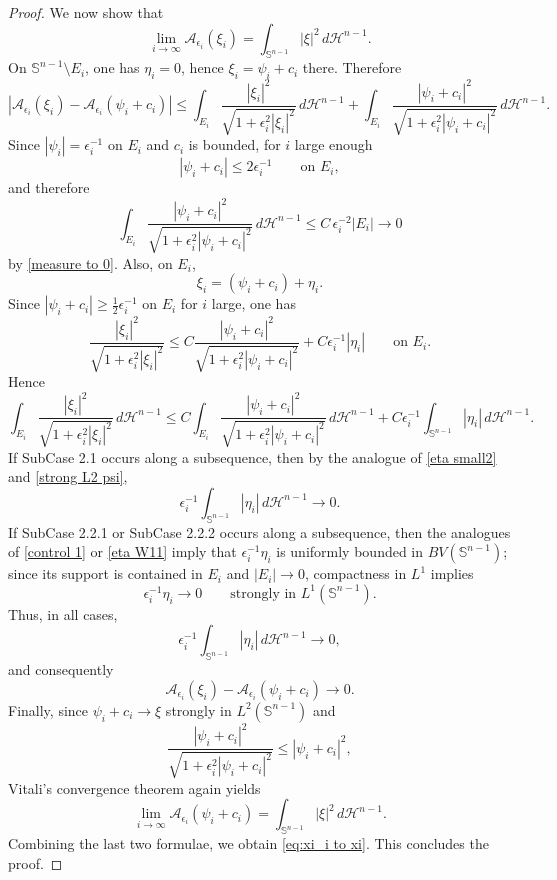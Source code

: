 \documentclass[10pt,a4paper]{amsart}
\begin{document}
\begin{proof}
We now show that
$$
\lim_{i\to\infty} \mathcal  A_{\epsilon_i}(\xi_i)=\int_{\mathbb S^{n-1}} |\xi|^2\,d\mathscr H^{n-1}.
$$
On $\mathbb S^{n-1}\setminus E_i$, one has $\eta_i=0$, hence $\xi_i=\psi_i+c_i$ there. Therefore
$$
|\mathcal A_{\epsilon_i}(\xi_i)-\mathcal A_{\epsilon_i}(\psi_i+c_i)|
\le
\int_{E_i}\frac{|\xi_i|^2}{\sqrt{1+\epsilon_i^2|\xi_i|^2}}\,d\mathscr H^{n-1}
+
\int_{E_i}\frac{|\psi_i+c_i|^2}{\sqrt{1+\epsilon_i^2|\psi_i+c_i|^2}}\,d\mathscr H^{n-1}.
$$
Since $|\psi_i|=\epsilon_i^{-1}$ on $E_i$ and $c_i$ is bounded, for $i$ large enough
$$
|\psi_i+c_i|\le 2\epsilon_i^{-1}\qquad\text{on }E_i,
$$
and therefore
$$
\int_{E_i}\frac{|\psi_i+c_i|^2}{\sqrt{1+\epsilon_i^2|\psi_i+c_i|^2}}\,d\mathscr H^{n-1}
\le C\,\epsilon_i^{-2}|E_i|\to 0
$$
by \eqref{measure to 0}. Also, on $E_i$,
$$
\xi_i=(\psi_i+c_i)+\eta_i.
$$
Since $|\psi_i+c_i|\ge \frac{1}{2}\epsilon_i^{-1}$ on $E_i$ for $i$ large, one has
$$
\frac{|\xi_i|^2}{\sqrt{1+\epsilon_i^2|\xi_i|^2}}
\le C\frac{|\psi_i+c_i|^2}{\sqrt{1+\epsilon_i^2|\psi_i+c_i|^2}}+C\epsilon_i^{-1}|\eta_i|
\qquad\text{on }E_i.
$$
Hence
$$
\int_{E_i}\frac{|\xi_i|^2}{\sqrt{1+\epsilon_i^2|\xi_i|^2}}\,d\mathscr H^{n-1}
\le
C\int_{E_i}\frac{|\psi_i+c_i|^2}{\sqrt{1+\epsilon_i^2|\psi_i+c_i|^2}}\,d\mathscr H^{n-1}
+
C\epsilon_i^{-1}\int_{\mathbb S^{n-1}}|\eta_i|\,d\mathscr H^{n-1}.
$$
If SubCase 2.1 occurs along a subsequence, then by the analogue of \eqref{eta small2} and \eqref{strong L2 psi},
$$
\epsilon_i^{-1}\int_{\mathbb S^{n-1}}|\eta_i|\,d\mathscr H^{n-1}\to 0.
$$
If SubCase 2.2.1 or SubCase 2.2.2 occurs along a subsequence, then the analogues of \eqref{control 1} or \eqref{eta W11} imply that $\epsilon_i^{-1}\eta_i$ is uniformly bounded in $BV(\mathbb S^{n-1})$; since its support is contained in $E_i$ and $|E_i|\to 0$, compactness in $L^1$ implies
$$
\epsilon_i^{-1}\eta_i\to 0 \qquad\text{strongly in }L^1(\mathbb S^{n-1}).
$$
Thus, in all cases,
$$
\epsilon_i^{-1}\int_{\mathbb S^{n-1}}|\eta_i|\,d\mathscr H^{n-1}\to 0,
$$
and consequently
$$
\mathcal A_{\epsilon_i}(\xi_i)-\mathcal A_{\epsilon_i}(\psi_i+c_i)\to 0.
$$
Finally, since $\psi_i+c_i\to \xi$ strongly in $L^2(\mathbb S^{n-1})$ and
$$
\frac{|\psi_i+c_i|^2}{\sqrt{1+\epsilon_i^2|\psi_i+c_i|^2}}
\le |\psi_i+c_i|^2,
$$
Vitali's convergence theorem again yields
$$
\lim_{i\to \infty} \mathcal A_{\epsilon_i}(\psi_i+c_i)
=
\int_{\mathbb S^{n-1}} |\xi|^2\,d\mathscr H^{n-1}.
$$
Combining the last two formulae, we obtain \eqref{eq:xi_i to xi}. This concludes the proof.
 


\end{proof}
\end{document}

